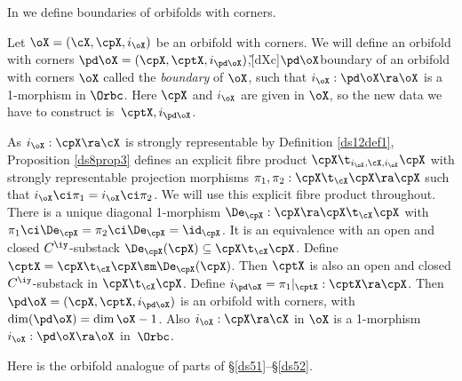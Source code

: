 \documentclass{article}
\begin{document}
In \cite[\S 8.6]{Joyc6} we define boundaries of orbifolds with
corners.

\begin{dfn} Let $\oX=(\cX,\cpX,i_\oX)$ be an orbifold with
corners. We will define an orbifold with corners $\pd\oX=(\cpX,
\cptX,i_{\pd\oX})$,\G[dXc]{$\pd\oX$}{boundary of an orbifold with
corners $\oX$} called the {\it boundary\/} of $\oX$, such that
$i_\oX:\pd\oX\ra\oX$ is a 1-morphism in $\Orbc$. Here $\cpX$ and
$i_\oX$ are given in $\oX$, so the new data we have to construct
is~$\cptX,i_{\pd\oX}$.

As $i_\oX:\cpX\ra\cX$ is strongly
representable by Definition \ref{ds12def1}, Proposition \ref{ds8prop3}
defines an explicit fibre product $\cpX\t_{i_\oX,\cX,i_\oX}\cpX$
with strongly representable projection morphisms
$\pi_1,\pi_2:\cpX\t_\cX\cpX\ra\cpX$ such that
$i_\oX\ci\pi_1=i_\oX\ci\pi_2$. We will use this explicit fibre
product throughout. There is a unique diagonal 1-morphism
$\De_\cpX:\cpX\ra\cpX\t_\cX\cpX$ with
$\pi_1\ci\De_\cpX=\pi_2\ci\De_\cpX=\id_\cpX$. It is an equivalence
with an open and closed $C^\iy$-substack
$\De_\cpX(\cpX)\subseteq\cpX\t_\cX\cpX$. Define $\cptX=
\cpX\t_\cX\cpX\sm\De_\cpX(\cpX)$. Then $\cptX$ is also an open and
closed $C^\iy$-substack in $\cpX\t_\cX\cpX$. Define
$i_{\pd\oX}=\pi_1\vert_\cptX: \cptX\ra\cpX$. Then
$\pd\oX=(\cpX,\cptX,i_{\pd\oX})$ is an orbifold with corners, with
$\dim(\pd\oX)=\dim\oX-1$. Also $i_\oX:\cpX\ra\cX$ in $\oX$ is a
1-morphism $i_\oX:\pd\oX\ra\oX$ in~$\Orbc$.
\label{ds12def3}
\end{dfn}

Here is the orbifold analogue of parts of
\S\ref{ds51}--\S\ref{ds52}.
\end{document}
